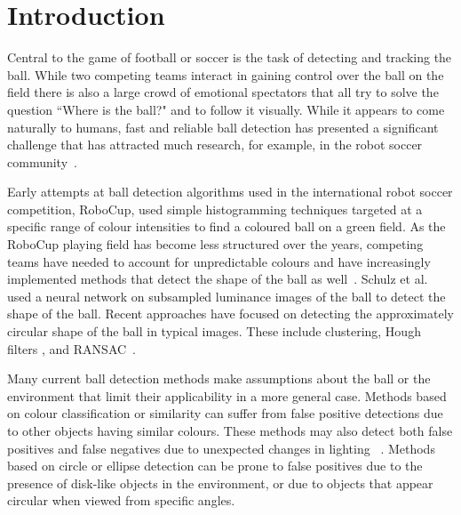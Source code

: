 \documentclass{sig-alternate-05-2015}
\newcommand{\citep}[1]{\cite{#1}}
\newcommand{\citet}[1]{\cite{#1}}
\begin{document}




	\section{Introduction} {
	\label{sec:intro}
Central to the game of football or soccer is the task of detecting and tracking the ball. While two competing teams interact in gaining control over the ball on the field there is also a large crowd of emotional spectators that all try to solve the question ``Where is the ball?" and to follow it visually. While it appears to come naturally to humans, fast and reliable ball detection has presented a significant challenge that has attracted much research, for example, in the robot soccer community~\cite{KitanoEtAl1997}.





		Early attempts at ball detection algorithms used in the international robot soccer competition, RoboCup, used simple histogramming techniques targeted at a specific range of colour intensities to find a coloured ball on a green field. As the RoboCup playing field has become less structured over the years, competing teams have needed to account for unpredictable colours and have increasingly implemented methods that detect the shape of the ball as well~\citep{MurchChalup2004}. Schulz et al.~\citet{schulz2007ball} used a neural network on subsampled luminance images of the ball to detect the shape of the ball. Recent approaches have focused on detecting the approximately circular shape of the ball in typical images. These include clustering, Hough filters \citep{li2013survey}, and RANSAC~\citep{annable2013nubots,FischlerBolles1981}.

		Many current ball detection methods make assumptions about the ball or the environment that limit their applicability in a more general case. Methods based on colour classification or similarity can suffer from false positive detections due to other objects having similar colours. These methods may also detect both false positives and false negatives due to unexpected changes in lighting ~\citep{HendersonEtAl2008}. Methods based on circle or ellipse detection can be prone to false positives due to the presence of disk-like objects in the environment, or due to objects that appear circular when viewed from specific angles.

}
\end{document}
